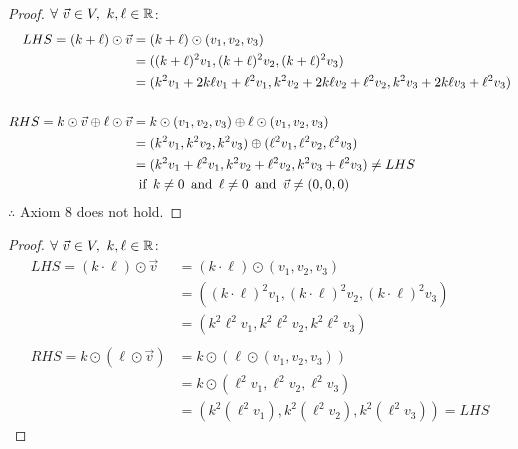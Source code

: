 \begin{enumerate}
\begin{proof}
    $\forall~\vec{v} \in V,~k,\ell \in \mathbb{R}$:
    \begin{align*}
      LHS = (k+\ell) \odot \vec{v}                    & = (k+\ell) \odot (v_1,v_2,v_3)                                                          \\
                                                      & = ((k+\ell)^2v_1,(k+\ell)^2v_2,(k+\ell)^2v_3)                                           \\
                                                      & = (k^2v_1+2k\ell v_1+\ell^2v_1,k^2v_2+2k\ell v_2+\ell^2v_2,k^2v_3+2k\ell v_3+\ell^2v_3) \\ \\
      RHS = k \odot \vec{v} \oplus \ell \odot \vec{v} & = k \odot (v_1,v_2,v_3) \oplus \ell \odot (v_1,v_2,v_3)                                 \\
                                                      & = (k^2v_1,k^2v_2,k^2v_3) \oplus (\ell^2v_1,\ell^2v_2,\ell^2v_3)                         \\
                                                      & = (k^2v_1 + \ell^2v_1, k^2v_2 + \ell^2v_2, k^2v_3 + \ell^2v_3) \neq LHS                 \\
                                                      & \operatorname{~\text{if}~} k \neq 0 \operatorname{~\text{and}~} \ell \neq 0 \operatorname{~\text{and}~} \vec{v} \neq (0,0,0)
    \end{align*}
    $\therefore$ Axiom 8 does not hold.
  \end{proof}
  \begin{proof}
    $\forall~\vec{v} \in V,~k,\ell \in \mathbb{R}$:
    \begin{align*}
      LHS = (k \cdot \ell) \odot \vec{v} & = (k \cdot \ell) \odot (v_1,v_2,v_3)                              \\
                                         & = ((k \cdot \ell)^2v_1, (k \cdot \ell)^2v_2, (k \cdot \ell)^2v_3) \\
                                         & = (k^2\ell^2v_1,k^2\ell^2v_2,k^2\ell^2v_3)                        \\ \\
      RHS = k \odot (\ell \odot \vec{v}) & = k \odot (\ell \odot (v_1,v_2,v_3))                              \\
                                         & = k \odot (\ell^2v_1,\ell^2v_2,\ell^2v_3)                         \\
                                         & = (k^2(\ell^2v_1),k^2(\ell^2v_2),k^2(\ell^2v_3)) = LHS

\end{align*}
\end{proof}
\end{enumerate}
